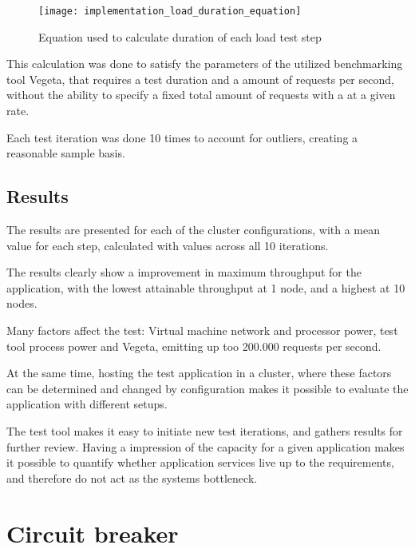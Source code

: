 \begin{figure}[!htb]
  \texttt{[image: implementation\_load\_duration\_equation]}  
  \caption{Equation used to calculate duration of each load test step}
  \label{fig:implementation_load_duration_equation}
\end{figure}

This calculation was done to satisfy the parameters of the utilized benchmarking tool Vegeta, that requires a test duration and a amount of requests per second, without the ability to specify a fixed total amount of requests with a at a given rate.

Each test iteration was done 10 times to account for outliers, creating a reasonable sample basis.


\subsection{Results}
The results are presented for each of the cluster configurations, with a mean value for each step, calculated with values across all 10 iterations. 

The results clearly show a improvement in maximum throughput for the application, with the lowest attainable throughput at 1 node, and a highest at 10 nodes.

Many factors affect the test: Virtual machine network and processor power, test tool process power and Vegeta, emitting up too 200.000 requests per second.

At the same time, hosting the test application in a cluster, where these factors can be determined and changed by configuration makes it possible to evaluate the application with different setups. 

The test tool makes it easy to initiate new test iterations, and gathers results for further review. Having a impression of the capacity for a given application makes it possible to quantify whether application services live up to the requirements, and therefore do not act as the systems bottleneck.



\section{Circuit breaker}



